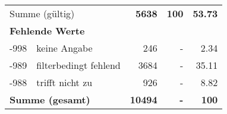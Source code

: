 \begin{longtable}{lXrrr}
     \midrule
     \multicolumn{2}{l}{Summe (gültig)} &
       \textbf{\num{5638}} &
     \textbf{100} &
       \textbf{\num[round-mode=places,round-precision=2]{53,73}} \\
     \multicolumn{5}{l}{\textbf{Fehlende Werte}}\\
       -998 &
       keine Angabe &
         \num{246} &
        - &
         \num[round-mode=places,round-precision=2]{2,34} \\
       -989 &
       filterbedingt fehlend &
         \num{3684} &
        - &
         \num[round-mode=places,round-precision=2]{35,11} \\
       -988 &
       trifft nicht zu &
         \num{926} &
        - &
         \num[round-mode=places,round-precision=2]{8,82} \\
     \midrule
     \multicolumn{2}{l}{\textbf{Summe (gesamt)}} &
          \textbf{\num{10494}} &
        \textbf{-} &
        \textbf{100} \\
     \bottomrule
     \end{longtable}
     
